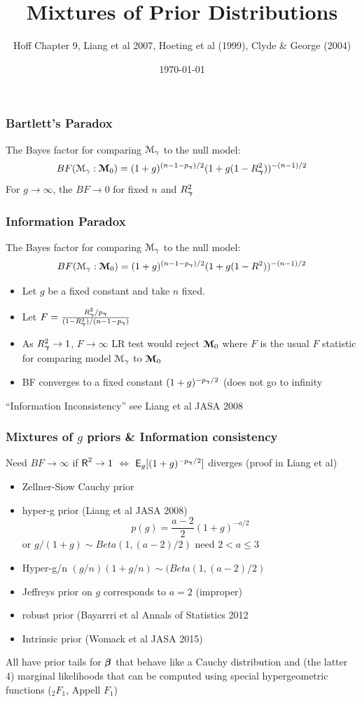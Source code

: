 \documentclass[handout]{beamer}
\title{Mixtures of Prior Distributions}
\author{Hoff Chapter 9, Liang et al 2007, Hoeting et al (1999), Clyde \&
 George (2004)}
\date{\today}
\begin{document}
\maketitle


\begin{frame}
  \frametitle{Bartlett's Paradox}
 The Bayes factor for comparing ${\cal M}_\gamma$ to the null
model:
$$
 BF({\cal M}_\gamma : \boldsymbol{{\cal M}}_0) =    (1 + g)^{(n - 1 - p_{\boldsymbol{\gamma}})/2} (1 + g(1 - R_{\boldsymbol{\gamma}}^2))^{-(n-1)/2}
$$
\pause 
For $g \to \infty$, the  $BF \to 0$ for fixed $n$ and $R_{\boldsymbol{\gamma}}^2$
\end{frame}


\begin{frame}
  \frametitle{Information Paradox}
  
The Bayes factor for comparing ${\cal M}_\gamma$ to the null
model:
$$
 BF({\cal M}_\gamma : \boldsymbol{{\cal M}}_0) =    (1 + g)^{(n - 1 - p_{\boldsymbol{\gamma}})/2} (1 + g(1 - R^2))^{-(n-1)/2}
$$
\pause
\begin{itemize}
\item Let $g$ be a fixed constant and take $n$ fixed. \pause
\item Let $F = \frac{R_{\boldsymbol{\gamma}}^2/p_{\boldsymbol{\gamma}}}{(1 - R_{\boldsymbol{\gamma}}^2)/(n - 1 - p_{\boldsymbol{\gamma}})}$ \pause
\item As $R^2_{\boldsymbol{\gamma}} \to 1$, $F \to \infty$ LR test would reject $\boldsymbol{{\cal M}}_0$
  where $F$ is the usual $F$ statistic for  comparing model ${\cal M}_\gamma$ to
  $\boldsymbol{{\cal M}}_0$ \pause 
\item BF converges to a fixed constant $(1+g)^{-p_{\boldsymbol{\gamma}}/2}$  (does not go
  to infinity
\end{itemize}

``Information Inconsistency''  see Liang et al JASA 2008


\end{frame}
\begin{frame}
  \frametitle{Mixtures of $g$ priors \& Information consistency}
  
Need $BF \to \infty$ if $\textsf{R}^2 \to 1$  $\Leftrightarrow$ $\textsf{E}_g[(1 +
g)^{-p_{\boldsymbol{\gamma}}/2}]$ diverges  (proof in Liang et al)
\pause
\begin{itemize}
\item Zellner-Siow Cauchy prior \pause
\item hyper-g prior (Liang et al JASA 2008) 
$$p(g) = \frac{a-2}{2}(1 + g)^{-a/2}$$ or $g/(1+g) \sim Beta(1, (a-2)/2)$ 
need $2 < a \le 3$
\pause
\item Hyper-g/n  $(g/n)(1 + g/n) \sim (Beta(1, (a-2)/2)$ \pause
\item Jeffreys prior on $g$ corresponds to $a = 2$ (improper)
\item robust prior (Bayarrri et al Annals of Statistics 2012 \pause
\item Intrinsic prior (Womack et al  JASA 2015)
\end{itemize}

 All have prior tails for $\boldsymbol{\beta}$  that behave like a Cauchy distribution
 and (the latter 4) marginal  likelihoods that can be computed using special hypergeometric
 functions   ($_2F_1$, Appell $F_1$)
\end{frame}
\end{document}

